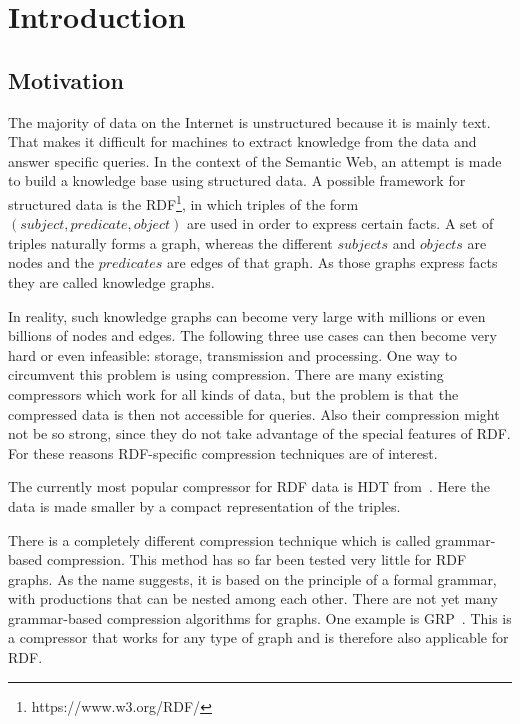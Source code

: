 \chapter{Introduction}\label{ch:introduction}

\section{Motivation}
The majority of data on the Internet is unstructured because it is mainly text. That makes it difficult for machines to extract knowledge from the data and answer specific queries. In the context of the Semantic Web, an attempt is made to build a knowledge base using structured data. A possible framework for structured data is the \ac{RDF}\footnote{https://www.w3.org/RDF/}, in which triples of the form $ (subject, predicate, object) $ are used in order to express certain facts. A set of triples naturally forms a graph, whereas the different $subjects$ and $objects$ are nodes and the $predicates$ are edges of that graph. As those graphs express facts they are called knowledge graphs.

In reality, such knowledge graphs can become very large with millions or even billions of nodes and edges.  The following three use cases can then become very hard or even infeasible: storage, transmission and processing. One way to circumvent this problem is using compression. There are many existing compressors which work for all kinds of data, but the problem is that the compressed data is then not accessible for queries. Also their compression might not be so strong, since they do not take advantage of the special features of RDF. For these reasons RDF-specific compression techniques are of interest.

The currently most popular compressor for RDF data is \ac{HDT} from~\cite{hdt}. Here the data is made smaller by a compact representation of the triples. 

There is a completely different compression technique which is called grammar-based compression. This method has so far been tested very little for RDF graphs. As the name suggests, it is based on the principle of a formal grammar, with productions that can be nested among each other. There are not yet many grammar-based compression algorithms for graphs. One example is \ac{GRP}~\cite{maneth}. This is a compressor that works for any type of graph and is therefore also applicable for RDF.

